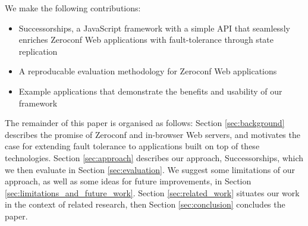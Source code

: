 We make the following contributions:
\begin{itemize}
	\item Successorships, a JavaScript framework with a simple API that seamlessly enriches Zeroconf Web applications with fault-tolerance through state replication
	\item A reproducable evaluation methodology for Zeroconf Web applications
	\item Example applications that demonstrate the benefits and usability of our framework
\end{itemize}

The remainder of this paper is organised as follows: Section \ref{sec:background} describes the promise of Zeroconf and in-browser Web servers, and motivates the case for extending fault tolerance to applications built on top of these technologies.
Section \ref{sec:approach} describes our approach, Successorships, which we then evaluate in Section \ref{sec:evaluation}.
We suggest some limitations of our approach, as well as some ideas for future improvements, in Section \ref{sec:limitations_and_future_work}.
Section \ref{sec:related_work} situates our work in the context of related research, then Section \ref{sec:conclusion} concludes the paper.
